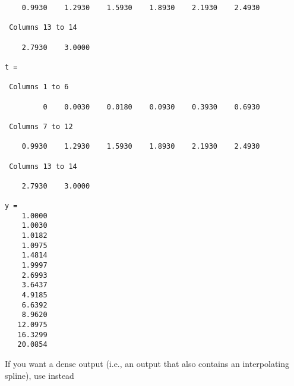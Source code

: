 \begin{verbatim}
    0.9930    1.2930    1.5930    1.8930    2.1930    2.4930 

 Columns 13 to 14

    2.7930    3.0000 

t = 

 Columns 1 to 6

         0    0.0030    0.0180    0.0930    0.3930    0.6930 

 Columns 7 to 12

    0.9930    1.2930    1.5930    1.8930    2.1930    2.4930 

 Columns 13 to 14

    2.7930    3.0000 

y = 
    1.0000 
    1.0030 
    1.0182 
    1.0975 
    1.4814 
    1.9997 
    2.6993 
    3.6437 
    4.9185 
    6.6392 
    8.9620 
   12.0975 
   16.3299 
   20.0854 
\end{verbatim}
 If you want a dense output (i.e., an output that also contains an interpolating
 spline), use instead
